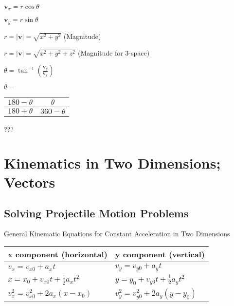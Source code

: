 \documentclass{extarticle}
\begin{document}
\begin{tcolorbox}[enhanced jigsaw,sharp corners,coltext=black,colback=BurntOrange!25!white,boxrule=0pt,breakable,size=minimal]
$\mathbf{v}_x=r\cos{\theta}$

$\mathbf{v}_y=r\sin{\theta}$

$r=\left|\mathbf{v}\right|=\sqrt{x^2+y^2}$ (Magnitude)

$r=\left|\mathbf{v}\right|=\sqrt{x^2+y^2+z^2}$ (Magnitude for 3-space)

$\theta=\tan^{-1}{(\frac{\mathbf{v}_y}{\mathbf{v}_x})}$



$\theta = $ \begin{tabu}{|c|c|}
    \hline
$180 - \theta$ & $\theta$ \\ \hline
$180 + \theta$ & $360 - \theta$ \\ \hline
    \end{tabu}???

    
    
    
    
    
    
    
    
\section{Kinematics in
Two Dimensions; Vectors}
    
    
\subsection{Solving Projectile Motion Problems}

General Kinematic Equations for Constant Acceleration
in Two Dimensions


\begin{tabu}{XX}
x component (horizontal) & 
y component (vertical) \\
\hline
$v_x = v_{x0} + a_xt$ &
$v_y = v_{y0} + a_yt$ \\

$x = x_0 + v_{x0}t + \frac{1}{2}a_xt^2$ & 
$y = y_0 + v_{y0}t + \frac{1}{2}a_yt^2$ \\

$v_x^2 = v_{x0}^2 + 2a_x(x - x_0)$ & 
$v_y^2 = v_{y0}^2 + 2a_y(y - y_0)$ \\ \hline
\end{tabu}
\end{tcolorbox}
\end{document}
